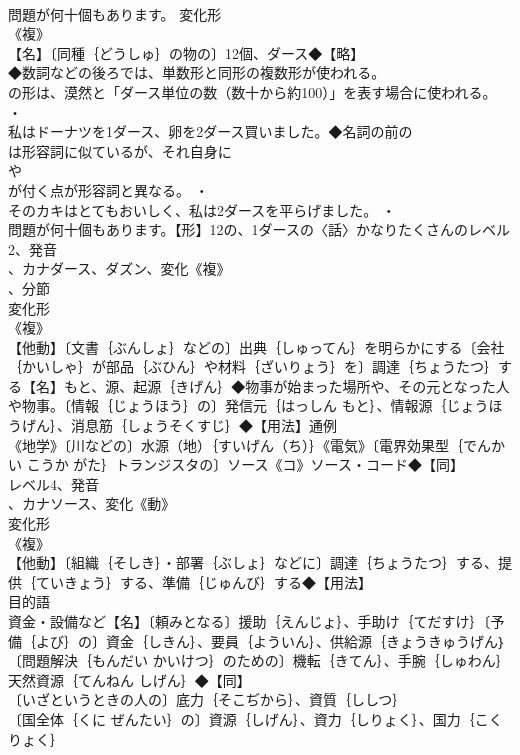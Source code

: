 \documentclass[8pt]{extreport}
\begin{document}
\begin{CJK}{UTF8}{min}
\\	問題が何十個もあります。	変化形 
\\	《複》
\\	【名】〔同種｛どうしゅ｝の物の〕12個、ダース◆【略】
\\	◆数詞などの後ろでは、単数形と同形の複数形が使われる。
\\	の形は、漠然と「ダース単位の数（数十から約100）」を表す場合に使われる。 ・
\\	私はドーナツを1ダース、卵を2ダース買いました。◆名詞の前の
\\	は形容詞に似ているが、それ自身に
\\	や
\\	が付く点が形容詞と異なる。 ・
\\	そのカキはとてもおいしく、私は2ダースを平らげました。 ・
\\	問題が何十個もあります。【形】12の、1ダースの〈話〉かなりたくさんのレベル2、発音
\\	、カナダース、ダズン、変化《複》
\\	、分節
\\	変化形 
\\	《複》
\\	【他動】〔文書｛ぶんしょ｝などの〕出典｛しゅってん｝を明らかにする〔会社｛かいしゃ｝が部品｛ぶひん｝や材料｛ざいりょう｝を〕調達｛ちょうたつ｝する【名】もと、源、起源｛きげん｝◆物事が始まった場所や、その元となった人や物事。〔情報｛じょうほう｝の〕発信元｛はっしん もと｝、情報源｛じょうほうげん｝、消息筋｛しょうそくすじ｝◆【用法】通例
\\	《地学》〔川などの〕水源（地）｛すいげん（ち）｝《電気》〔電界効果型｛でんかい こうか がた｝トランジスタの〕ソース《コ》ソース・コード◆【同】
\\	レベル4、発音
\\	、カナソース、変化《動》
\\	変化形 
\\	《複》
\\	【他動】〔組織｛そしき｝・部署｛ぶしょ｝などに〕調達｛ちょうたつ｝する、提供｛ていきょう｝する、準備｛じゅんび｝する◆【用法】
\\	目的語 
\\	資金・設備など【名】〔頼みとなる〕援助｛えんじょ｝、手助け｛てだすけ｝〔予備｛よび｝の〕資金｛しきん｝、要員｛よういん｝、供給源｛きょうきゅうげん｝〔問題解決｛もんだい かいけつ｝のための〕機転｛きてん｝、手腕｛しゅわん｝天然資源｛てんねん しげん｝◆【同】
\\	〔いざというときの人の〕底力｛そこぢから｝、資質｛ししつ｝
\\	〔国全体｛くに ぜんたい｝の〕資源｛しげん｝、資力｛しりょく｝、国力｛こくりょく｝

\end{CJK}
\end{document}
